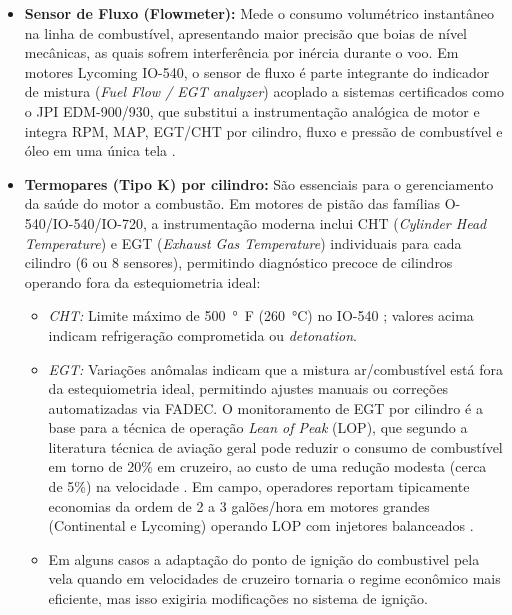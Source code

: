 \documentclass[a4paper,12pt]{article}
\begin{document}
\begin{itemize}
    \item \textbf{Sensor de Fluxo (Flowmeter):} Mede o consumo volumétrico instantâneo na linha de combustível, apresentando maior precisão que boias de nível mecânicas, as quais sofrem interferência por inércia durante o voo. Em motores Lycoming IO-540, o sensor de fluxo é parte integrante do indicador de mistura (\textit{Fuel Flow / EGT analyzer}) acoplado a sistemas certificados como o JPI EDM-900/930, que substitui a instrumentação analógica de motor e integra RPM, MAP, EGT/CHT por cilindro, fluxo e pressão de combustível e óleo em uma única tela \cite{jpi_edm900, jpi_edm930_manual}.
    
    \item \textbf{Termopares (Tipo K) por cilindro:} São essenciais para o gerenciamento da saúde do motor a combustão. Em motores de pistão das famílias O-540/IO-540/IO-720, a instrumentação moderna inclui CHT (\textit{Cylinder Head Temperature}) e EGT (\textit{Exhaust Gas Temperature}) individuais para cada cilindro (6 ou 8 sensores), permitindo diagnóstico precoce de cilindros operando fora da estequiometria ideal:
    \begin{itemize}
        \item \textit{CHT:} Limite máximo de \SI{500}{\degree F} (\SI{260}{\degreeCelsius}) no IO-540 \cite{lycomingmanual}; valores acima indicam refrigeração comprometida ou \textit{detonation}.
        \item \textit{EGT:} Variações anômalas indicam que a mistura ar/combustível está fora da estequiometria ideal, permitindo ajustes manuais ou correções automatizadas via FADEC. O monitoramento de EGT por cilindro é a base para a técnica de operação \textit{Lean of Peak} (LOP), que segundo a literatura técnica de aviação geral pode reduzir o consumo de combustível em torno de 20\% em cruzeiro, ao custo de uma redução modesta (cerca de 5\%) na velocidade \cite{aopa_lop}. Em campo, operadores reportam tipicamente economias da ordem de 2 a 3 galões/hora em motores grandes (Continental e Lycoming) operando LOP com injetores balanceados \cite{aviation_consumer_gami}.
        \item Em alguns casos a adaptação do ponto de ignição do combustivel pela vela quando em velocidades de cruzeiro tornaria o regime econômico mais eficiente, mas isso exigiria modificações no sistema de ignição.
    \end{itemize}
\end{itemize}
\end{document}

